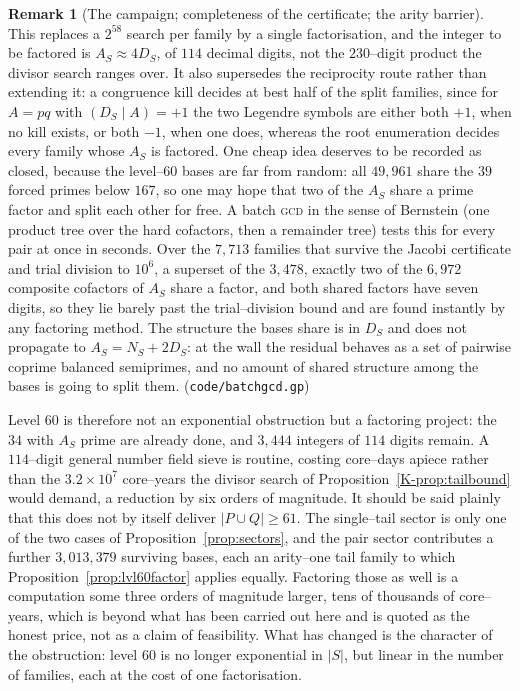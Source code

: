 \documentclass[11pt]{article}
\theoremstyle{definition}
\newtheorem{remark}[theorem]{Remark}
\begin{document}
\begin{remark}[The campaign; completeness of the certificate; the arity barrier]
This replaces a $2^{58}$ search per family by a single factorisation, and the integer to be factored is
$A_S\approx4D_S$, of $114$ decimal digits, not the $230$--digit product the divisor search ranges over.
It also supersedes the reciprocity route rather than extending it: a congruence kill decides at best
half of the split families, since for $A=pq$ with $(D_S\mid A)=+1$ the two Legendre symbols are either
both $+1$, when no kill exists, or both $-1$, when one does, whereas the root enumeration decides every
family whose $A_S$ is factored. One cheap idea deserves to be recorded as closed, because the level--$60$ bases are far from random:
all $49{,}961$ share the $39$ forced primes below $167$, so one may hope that two of the $A_S$ share a
prime factor and split each other for free. A batch \textsc{gcd} in the sense of Bernstein (one
product tree over the hard cofactors, then a remainder tree) tests this for every pair at once in
seconds. Over the $7{,}713$ families that survive the Jacobi certificate and trial division to $10^6$,
a superset of the $3{,}478$, exactly two of the $6{,}972$ composite cofactors of $A_S$ share a factor,
and both shared factors have seven digits, so they lie barely past the trial--division bound and are
found instantly by any factoring method. The structure the bases share is in $D_S$ and does not
propagate to $A_S=N_S+2D_S$: at the wall the residual behaves as a set of pairwise coprime balanced
semiprimes, and no amount of shared structure among the bases is going to split them.
\textup{(\texttt{code/batchgcd.gp})}

Level $60$ is therefore not an exponential obstruction but a factoring
project: the $34$ with $A_S$ prime are already done, and $3{,}444$ integers of $114$ digits remain.
A $114$--digit general number field sieve is routine, costing core--days apiece rather than the
$3.2\times10^7$ core--years the divisor search of Proposition~\ref{K-prop:tailbound} would demand, a
reduction by six orders of magnitude. It should be said plainly that this does not by itself deliver
$|P\cup Q|\ge61$. The single--tail sector is only one of the two cases of
Proposition~\ref{prop:sectors}, and the pair sector contributes a further $3{,}013{,}379$ surviving
bases, each an arity--one tail family to which Proposition~\ref{prop:lvl60factor} applies equally.
Factoring those as well is a computation some three orders of magnitude larger, tens of thousands of
core--years, which is beyond what has been carried out here and is quoted as the honest price, not
as a claim of feasibility. What has changed is the character of the obstruction: level $60$ is no
longer exponential in $|S|$, but linear in the number of families, each at the cost of one
factorisation.


\end{remark}
\end{document}
